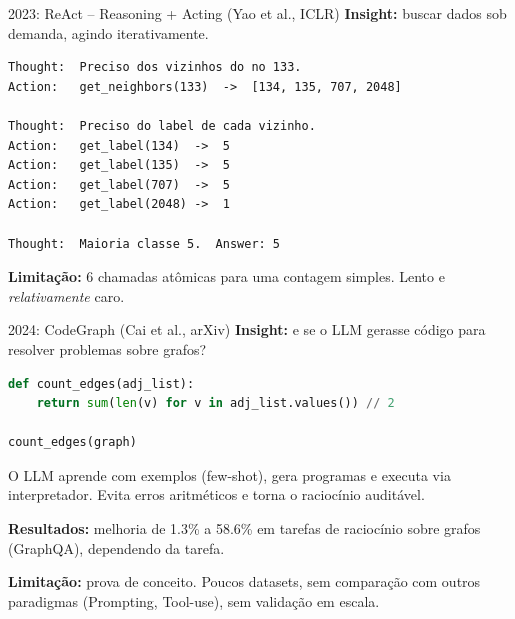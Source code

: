 \documentclass{beamer}
\begin{document}
\begin{frame}[fragile]{2023: ReAct -- Reasoning + Acting (Yao et al., ICLR)}
  \textbf{Insight:} buscar dados sob demanda, agindo iterativamente.

  \vspace{0.3em}
  \begin{lstlisting}[basicstyle=\ttfamily\scriptsize]
Thought:  Preciso dos vizinhos do no 133.
Action:   get_neighbors(133)  ->  [134, 135, 707, 2048]

Thought:  Preciso do label de cada vizinho.
Action:   get_label(134)  ->  5
Action:   get_label(135)  ->  5
Action:   get_label(707)  ->  5
Action:   get_label(2048) ->  1

Thought:  Maioria classe 5.  Answer: 5
  \end{lstlisting}

  \vspace{0.3em}
  \textbf{Limitação:} 6 chamadas atômicas para uma contagem simples. Lento e \textit{relativamente} caro.
\end{frame}

\begin{frame}[fragile]{2024: CodeGraph (Cai et al., arXiv)}
  \textbf{Insight:} e se o LLM gerasse código para resolver problemas sobre grafos?

  \vspace{0.3em}
  \begin{lstlisting}[language=Python, basicstyle=\ttfamily\scriptsize]
def count_edges(adj_list):
    return sum(len(v) for v in adj_list.values()) // 2

count_edges(graph)
  \end{lstlisting}

  \vspace{0.3em}
  O LLM aprende com exemplos (few-shot), gera programas e executa via interpretador. Evita erros aritméticos e torna o raciocínio auditável.

  \vspace{0.5em}
  \textbf{Resultados:} melhoria de 1.3\% a 58.6\% em tarefas de raciocínio sobre grafos (GraphQA), dependendo da tarefa.

  \vspace{0.5em}
  \textbf{Limitação:} prova de conceito. Poucos datasets, sem comparação com outros paradigmas (Prompting, Tool-use), sem validação em escala.
\end{frame}
\end{document}

